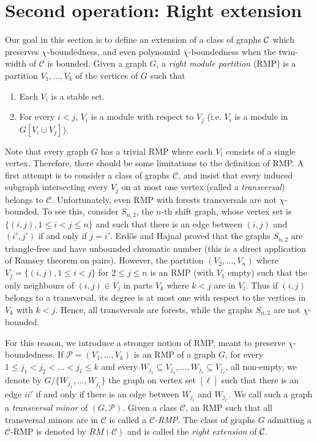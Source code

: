 \documentclass[11pt]{article}
\numberwithin{equation}{section}
\begin{document}
\section{Second operation: Right extension}

Our goal in this section is to define an extension of a class of graphs $\cal C$ which preserves $\chi$-boundedness, and even polynomial $\chi$-boundedness when the twin-width of $\mathcal{C}$ is bounded. Given a graph $G$, a \emph{right module partition} (RMP) is a partition $V_1, \ldots, V_k$ of the vertices of $G$ such that \begin{enumerate}
    \item Each $V_i$ is a stable set.
    \item For every $i < j$, $V_i$ is a module with respect to $V_j$ (i.e. $V_i$ is a module in $G[V_i\cup V_j]$).
\end{enumerate}

Note that every graph $G$ has a trivial RMP where each $V_i$ consists of a single vertex. Therefore, there should be some limitations to the definition of RMP. A first attempt is to consider a class of graphs $\mathcal{C}$, and insist that every induced subgraph intersecting every $V_j$ on at most one vertex (called a \emph{transversal}) belongs to $\mathcal{C}$. 
Unfortunately, even RMP with forests transversals are not $\chi$-bounded. To see this, consider $S_{n,2}$, the $n$-th shift graph, whose vertex set is $\{(i, j), 1 \leq i < j \leq n\}$ and such that there is an edge between $(i, j)$ and $(i', j')$ if and only if $j = i'$. Erd\H{o}s and Hajnal \cite{EH64} proved that the graphs $S_{n,2}$ are triangle-free and have unbounded chromatic number (this is a direct application of Ramsey theorem on pairs). However, the partition $(V_2, \ldots, V_n)$ where $V_j = \{(i, j), 1 \leq i < j\}$ for $2 \leq j \leq n$ is an RMP (with $V_1$ empty) such that the only neighbours of $(i,j)\in V_j$ in parts $V_k$ where $k<j$ are in $V_i$. Thus if $(i,j)$ belongs to a transversal, its degree is at most one with respect to the vertices in $V_k$ with $k < j$. Hence, all transversals are forests, while the graphs $S_{n,2}$ are not $\chi$-bounded.


For this reason, we introduce a stronger notion of RMP, meant to preserve $\chi$-boundedness.
    If $\mathcal{P} = (V_1, \ldots, V_k)$ is an RMP of a graph $G$, for every $1 \leq j_1 < j_2 < \ldots < j_\ell \leq k$ and every $W_{j_1} \subseteq V_{j_1}, \ldots, W_{j_\ell} \subseteq V_{j_\ell}$, all non-empty, we denote by $G/\{W_{j_1}, \ldots ,W_{j_\ell}\}$ the graph on vertex set $[\ell]$ such that there is an edge $ii'$ if and only if there is an edge between $W_{j_i}$ and $W_{j_{i'}}$. We call such a graph a \emph{transversal minor} of $(G, \mathcal{P})$.
    Given a class $\mathcal{C}$, an RMP such that all transversal minors are in $\mathcal{C}$ is called a \emph{$\mathcal{C}$-RMP}. The class of graphs $G$ admitting a $\mathcal{C}$-RMP is denoted by $RM(\mathcal{C})$ and is called the \emph{right extension} of $\cal C$.
\end{document}
